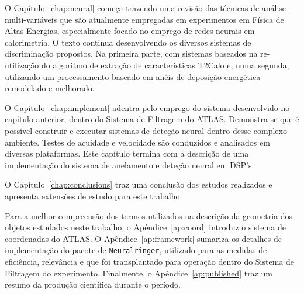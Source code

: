 O Capítulo~\ref{chap:neural} começa trazendo uma revisão das técnicas de
análise multi-variáveis que são atualmente empregadas em experimentos em Física
de Altas Energias, especialmente focado no emprego de redes neurais em
calorimetria. O texto continua desenvolvendo os diversos sistemas de
discriminação propostos. Na primeira parte, com sistemas baseados na
re-utilização do algoritmo de extração de características T2Calo e, numa
segunda, utilizando um processamento baseado em anéis de deposição energética
remodelado e melhorado.

O Capítulo~\ref{chap:implement} adentra pelo emprego do sistema desenvolvido
no capítulo anterior, dentro do Sistema de Filtragem do ATLAS. Demonstra-se
que é possível construir e executar sistemas de deteção neural dentro desse
complexo ambiente. Testes de acuidade e velocidade são conduzidos e analisados
em diversas plataformas. Este capítulo termina com a descrição de uma
implementação do sistema de anelamento e deteção neural em DSP's.

O Capítulo~\ref{chap:conclusions} traz uma conclusão dos estudos realizados e
apresenta extensões de estudo para este trabalho.

Para a melhor compreensão dos termos utilizados na descrição da geometria dos
objetos estudados neste trabalho, o Apêndice~\ref{ap:coord} introduz o sistema
de coordenadas do ATLAS. O Apêndice~\ref{ap:framework} sumariza os detalhes de
implementação do pacote de  \texttt{Neuralringer}, utilizado
para as medidas de eficiência, relevância e que foi transplantado para
operação dentro do Sistema de Filtragem do experimento. Finalmente, o
Apêndice~\ref{ap:published} traz um resumo da produção científica durante o
período.

